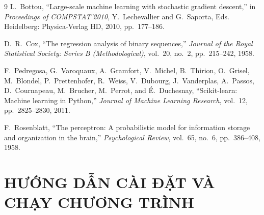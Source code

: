 \documentclass[12pt,a4paper,oneside]{report}
\newcommand{\bmchapname}{Chương}
\newcommand{\tocchapname}{Chương}
\begin{document}
\begin{thebibliography}{9}
  L.~Bottou, ``Large-scale machine learning with stochastic gradient descent,'' in \textit{Proceedings of COMPSTAT'2010}, Y.~Lechevallier and G.~Saporta, Eds. Heidelberg: Physica-Verlag HD, 2010, pp.~177--186.

  D.~R.~Cox, ``The regression analysis of binary sequences,'' \textit{Journal of the Royal Statistical Society: Series B (Methodological)}, vol.~20, no.~2, pp.~215--242, 1958.

  F.~Pedregosa, G.~Varoquaux, A.~Gramfort, V.~Michel, B.~Thirion, O.~Grisel, M.~Blondel, P.~Prettenhofer, R.~Weiss, V.~Dubourg, J.~Vanderplas, A.~Passos, D.~Cournapeau, M.~Brucher, M.~Perrot, and \'E.~Duchesnay, ``Scikit-learn: Machine learning in Python,'' \textit{Journal of Machine Learning Research}, vol.~12, pp.~2825--2830, 2011.

  F.~Rosenblatt, ``The perceptron: A probabilistic model for information storage and organization in the brain,'' \textit{Psychological Review}, vol.~65, no.~6, pp.~386--408, 1958.
\end{thebibliography}

\appendix
\renewcommand{\bmchapname}{Phụ lục}
\renewcommand{\tocchapname}{Phụ lục}

\chapter{HƯỚNG DẪN CÀI ĐẶT VÀ CHẠY CHƯƠNG TRÌNH}
\end{document}
